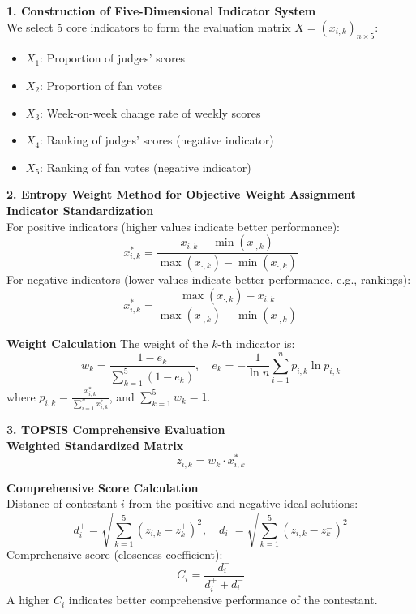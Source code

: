 \documentclass{mcmthesis}
\begin{document}
\noindent\textbf{1. Construction of Five-Dimensional Indicator System}\hfill\\

We select 5 core indicators to form the evaluation matrix $X=(x_{i,k})_{n \times 5}$:
\begin{itemize}
\item $X_1$: Proportion of judges' scores
\item $X_2$: Proportion of fan votes
\item $X_3$: Week-on-week change rate of weekly scores
\item $X_4$: Ranking of judges' scores (negative indicator)
\item $X_5$: Ranking of fan votes (negative indicator)
\end{itemize}
\noindent\textbf{2. Entropy Weight Method for Objective Weight Assignment}\hfill\\

\textbf{Indicator Standardization}\hfill\\

For positive indicators (higher values indicate better performance):
\begin{equation}
x_{i,k}^* = \frac{x_{i,k} - \min(x_{\cdot,k})}{\max(x_{\cdot,k}) - \min(x_{\cdot,k})}
\end{equation}
For negative indicators (lower values indicate better performance, e.g., rankings):
\begin{equation}
x_{i,k}^* = \frac{\max(x_{\cdot,k}) - x_{i,k}}{\max(x_{\cdot,k}) - \min(x_{\cdot,k})}
\end{equation}

\textbf{Weight Calculation}
The weight of the $k$-th indicator is:
\begin{equation}
w_k = \frac{1 - e_k}{\sum_{k=1}^5 (1 - e_k)}, \quad e_k = -\frac{1}{\ln n} \sum_{i=1}^n p_{i,k} \ln p_{i,k}
\end{equation}
where $p_{i,k} = \frac{x_{i,k}^*}{\sum_{i=1}^n x_{i,k}^*}$, and $\sum_{k=1}^5 w_k = 1$.

\noindent\textbf{3. TOPSIS Comprehensive Evaluation}\hfill\\

\textbf{Weighted Standardized Matrix}
\begin{equation}
z_{i,k} = w_k \cdot x_{i,k}^*
\end{equation}

\textbf{Comprehensive Score Calculation}\hfill\\

Distance of contestant $i$ from the positive and negative ideal solutions:
\begin{equation}
d_i^+ = \sqrt{\sum_{k=1}^5 (z_{i,k} - z_k^+)^2}, \quad d_i^- = \sqrt{\sum_{k=1}^5 (z_{i,k} - z_k^-)^2}
\end{equation}
Comprehensive score (closeness coefficient):
\begin{equation}
C_i = \frac{d_i^-}{d_i^+ + d_i^-}
\end{equation}
A higher $C_i$ indicates better comprehensive performance of the contestant.
\end{document}
